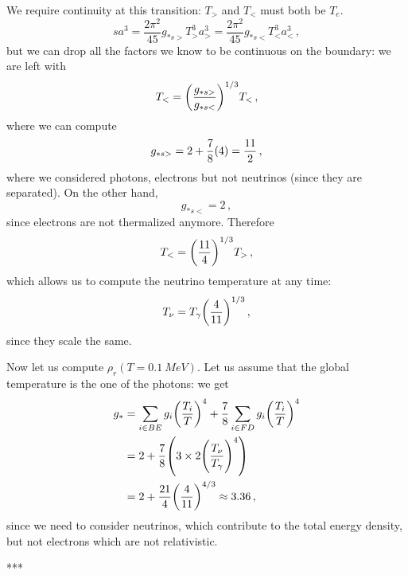\documentclass[main.tex]{subfiles}
\begin{document}
We require continuity at this transition: \(T_{>}\) and \(T_{<}\) must both be \(T_{e}\).  
%
\begin{equation}
  s a^3 = 
  \frac{2 \pi^2}{45} g_{*s>}T^{3}_{>} a^{3}_{>} = 
  \frac{2 \pi^2}{45} g_{*s<}T^{3}_{<} a^{3}_{<}
\,,
\end{equation}
%
but we can drop all the factors we know to be continuous on the boundary:
we are left with 
%
\begin{equation}
  T_{<} = \qty(\frac{g_{*s>}}{g_{*s<}})^{1/3} T_{<}
\,,
\end{equation}
%
where we can compute 
%
\begin{equation}
  g_{* s>} = 2 + \frac{7}{8}\qty(4) = \frac{11}{2}
\,,
\end{equation}
%
where we considered photons, electrons but not neutrinos (since they are separated). On the other hand, 
%
\begin{equation}
  g_{*s<} = 2
\,,
\end{equation}
%
since electrons are not thermalized anymore. Therefore 
%
\begin{equation}
  T_{<} = \qty(\frac{11}{4})^{1/3} T_{>}
\,,
\end{equation}
%
which allows us to compute the neutrino temperature at any time: 
%
\begin{equation}
  T_{\nu } = T_{\gamma } \qty(\frac{4}{11})^{1/3}
\,,
\end{equation}
%
since they scale the same.

Now let us compute \(\rho_{r} (T = \SI{0.1}{MeV})\).
Let us assume that the global temperature is the one of the photons: we get 
%
\begin{subequations}
\begin{align}
  g_{*} &=  \sum _{i \in BE} g_i \qty(\frac{T_i}{T})^{4} + 
  \frac{7}{8}\sum _{i \in FD} g_i \qty(\frac{T_i}{T})^{4}  \\
  &= 2 + \frac{7}{8} \qty(3 \times 2 \qty(\frac{T_{\nu }}{T_{\gamma }})^{4})  \\
  &= 2 + \frac{21}{4} \qty(\frac{4}{11})^{4/3} \approx 3.36
\,,
\end{align}
\end{subequations}
%
since we need to consider neutrinos, which contribute to the total energy density, but not electrons which are not relativistic.

\medskip
\begin{center}
    ***
\end{center}
\medskip
\end{document}
